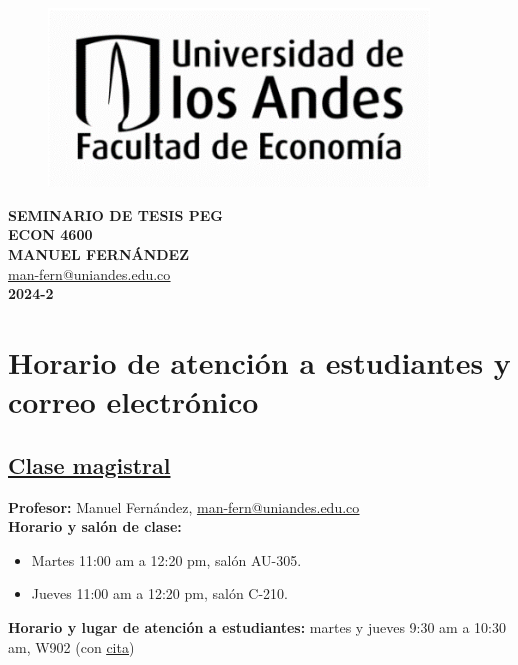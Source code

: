 \documentclass[12pt]{article}
\begin{document}
\begin{minipage}{0.4\textwidth}
    \begin{center}
        \begin{figure}[H]
            \includegraphics[width=0.9\textwidth]{LogoUEcon.png}
        \end{figure}
    \end{center}    
\end{minipage} \hfill
\begin{minipage}{0.6\textwidth}
    \begin{center}
        \textbf{SEMINARIO DE TESIS PEG} \\
        \textbf{ECON 4600} \\
        \textbf{MANUEL FERNÁNDEZ} \\ 
        \href{mailto:man-fern@uniandes.edu.co}{\underline{man-fern@uniandes.edu.co}} \\
        \textbf{2024-2}
    \end{center}
\end{minipage}

\section{Horario de atención a estudiantes y correo electrónico}	

\subsection*{\underline{Clase magistral}}

\textbf{Profesor:} Manuel Fernández, \href{mailto:man-fern@uniandes.edu.co}{\underline{man-fern@uniandes.edu.co}} \\
\textbf{Horario y salón de clase:} \vspace{-0.7em}
\begin{itemize}
    \item Martes 11:00 am a 12:20 pm, salón AU-305. \vspace{-0.7em}
    \item Jueves 11:00 am a 12:20 pm, salón C-210. \vspace{-0.7em}
\end{itemize}
\textbf{Horario y lugar de atención a estudiantes:} martes y jueves 9:30 am a 10:30 am, W902 (con \href{https://man-fern.github.io//teaching/}{\underline{cita}})
\end{document}
